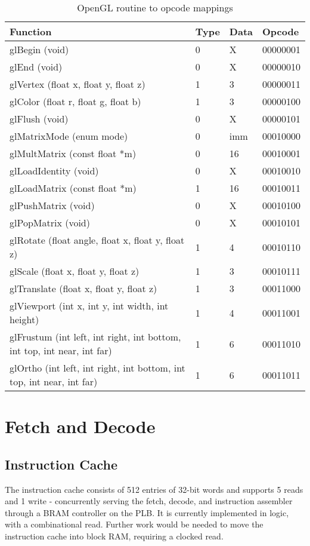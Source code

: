 \documentclass[letterpaper,10pt]{article}
\begin{document}
\begin{table}[htbp]
\begin{center}
\begin{tabular}{ | l | l | l | l |}
\hline
Function & Type & Data & Opcode \\ \hline
glBegin (void) & 0 & X & 00000001 \\ \hline
glEnd (void) & 0 & X & 00000010 \\ \hline
glVertex (float x, float y, float z) & 1 & 3 & 00000011 \\ \hline
glColor (float r, float g, float b) & 1 & 3 & 00000100 \\ \hline
glFlush (void) & 0 & X & 00000101 \\ \hline
glMatrixMode (enum mode) & 0 & imm & 00010000 \\ \hline
glMultMatrix (const float *m) & 0 & 16 & 00010001 \\ \hline
glLoadIdentity (void) & 0 & X & 00010010 \\ \hline
glLoadMatrix (const float *m) & 1 & 16 & 00010011 \\ \hline
glPushMatrix (void) & 0 & X & 00010100 \\ \hline
glPopMatrix (void) & 0 & X & 00010101 \\ \hline
glRotate (float angle, float x, float y, float z) & 1 & 4 & 00010110 \\ \hline
glScale (float x, float y, float z) & 1 & 3 & 00010111 \\ \hline
glTranslate (float x, float y, float z) & 1 & 3 & 00011000 \\ \hline
glViewport (int x, int y, int width, int height) & 1 & 4 & 00011001 \\ \hline
glFrustum (int left, int right, int bottom, int top, int near, int far) & 1 & 6 & 00011010 \\ \hline
glOrtho (int left, int right, int bottom, int top, int near, int far) & 1 & 6 & 00011011 \\ \hline
\end{tabular}
\end{center}
\caption{OpenGL routine to opcode mappings}
\end{table}

\section{Fetch and Decode}
\subsection{Instruction Cache}
The instruction cache consists of 512 entries of 32-bit words and supports 5 reads and 1 write - concurrently serving the fetch, decode, and instruction assembler through a BRAM controller on the PLB. It is currently implemented in logic, with a combinational read. Further work would be needed to move the instruction cache into block RAM, requiring a clocked read.
\end{document}
